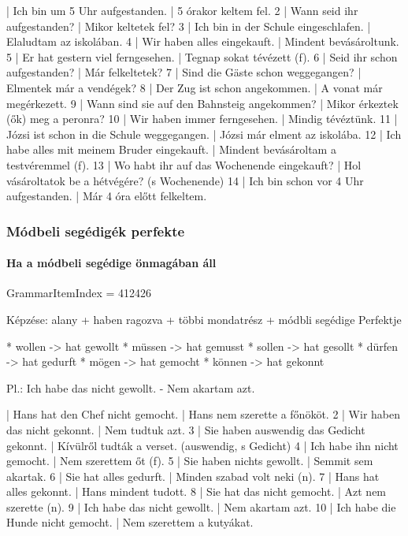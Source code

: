 \documentclass{article}
\newenvironment{desc}{\verbatim}{\endverbatim}
\newenvironment{exmp}{\verbatim}{\endverbatim}
\begin{document}
\begin{exmp}
1 | Ich bin um 5 Uhr aufgestanden. | 5 órakor keltem fel.
2 | Wann seid ihr aufgestanden? | Mikor keltetek fel?
3 | Ich bin in der Schule eingeschlafen. | Elaludtam az iskolában.
4 | Wir haben alles eingekauft. | Mindent bevásároltunk.
5 | Er hat gestern viel ferngesehen. | Tegnap sokat tévézett (f).
6 | Seid ihr schon aufgestanden? | Már felkeltetek?
7 | Sind die Gäste schon weggegangen? | Elmentek már a vendégek?
8 | Der Zug ist schon angekommen. | A vonat már megérkezett.
9 | Wann sind sie auf den Bahnsteig angekommen? | Mikor érkeztek (ők) meg a peronra?
10 | Wir haben immer ferngesehen. | Mindig tévéztünk.
11 | Józsi ist schon in die Schule weggegangen. | Józsi már elment az iskolába.
12 | Ich habe alles mit meinem Bruder eingekauft. | Mindent bevásároltam a testvéremmel (f).
13 | Wo habt ihr auf das Wochenende eingekauft? | Hol vásároltatok be a hétvégére? (s Wochenende)
14 | Ich bin schon vor 4 Uhr aufgestanden. | Már 4 óra előtt felkeltem.
\end{exmp}

\subsubsection{Módbeli segédigék perfekte}

\paragraph{Ha a módbeli segédige önmagában áll}

GrammarItemIndex = 412426

\begin{desc}
Képzése:
alany + haben ragozva + többi mondatrész + módbli segédige Perfektje

* wollen -> hat gewollt
* müssen -> hat gemusst
* sollen -> hat gesollt
* dürfen -> hat gedurft
* mögen -> hat gemocht
* können -> hat gekonnt

Pl.: Ich habe das nicht gewollt. - Nem akartam azt.
\end{desc}

\begin{exmp}
1 | Hans hat den Chef nicht gemocht. | Hans nem szerette a főnököt.
2 | Wir haben das nicht gekonnt. | Nem tudtuk azt.
3 | Sie haben auswendig das Gedicht gekonnt. | Kívülről tudták a verset. (auswendig, s Gedicht)
4 | Ich habe ihn nicht gemocht. | Nem szerettem őt (f).
5 | Sie haben nichts gewollt. | Semmit sem akartak.
6 | Sie hat alles gedurft. | Minden szabad volt neki (n).
7 | Hans hat alles gekonnt. | Hans mindent tudott.
8 | Sie hat das nicht gemocht. | Azt nem szerette (n).
9 | Ich habe das nicht gewollt. | Nem akartam azt.
10 | Ich habe die Hunde nicht gemocht. | Nem szerettem a kutyákat.
\end{exmp}
\end{document}
